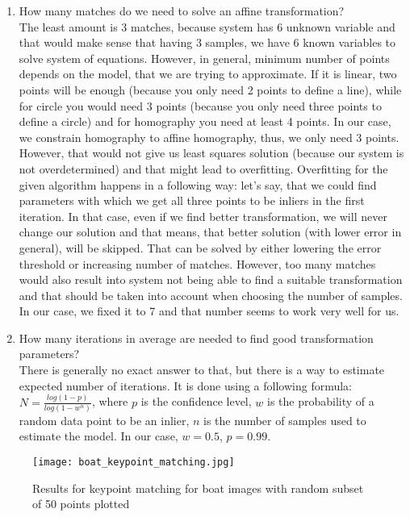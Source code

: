 \documentclass{article}
\begin{document}
\begin{enumerate}
    \item How many matches do we need to solve an affine transformation?\\
    
    The least amount is 3 matches, because system has 6 unknown variable and that would make sense that having 3 samples, we have 6 known variables to solve system of equations. However, in general, minimum number of points depends on the model, that we are trying to approximate. If it is linear, two points will be enough (because you only need 2 points to define a line), while for circle you would need 3 points (because you only need three points to define a circle) and for homography you need at least 4 points. In our case, we constrain homography to affine homography, thus, we only need 3 points.\\
    
    However, that would not give us least squares solution (because our system is not overdetermined) and that might lead to overfitting. Overfitting for the given algorithm happens in a following way: let's say, that we could find parameters with which we get all three points to be inliers in the first iteration. In that case, even if we find better transformation, we will never change our solution and that means, that better solution (with lower error in general), will be skipped. That can be solved by either lowering the error threshold or increasing number of matches. However, too many matches would also result into system not being able to find a suitable transformation and that should be taken into account when choosing the number of samples. In our case, we fixed it to 7 and that number seems to work very well for us.
    \newpage
    
    \item How many iterations in average are needed to find good transformation parameters?\\
    
    There is generally no exact answer to that, but there is a way to estimate expected number of iterations. It is done using a following formula: $N = \frac{log(1-p)}{log(1-w^n)}$, where $p$ is the confidence level, $w$ is the probability of a random data point to be an inlier, $n$ is the number of samples used to estimate the model. In our case, $w = 0.5$, $p = 0.99$.
    \end{enumerate}

\begin{figure}[h]
  \caption{Results for keypoint matching for boat images with random subset of 50 points plotted}
  \centering
    \texttt{[image: boat\_keypoint\_matching.jpg]}
  \label{fig:boat_matching}
\end{figure}
\end{document}
